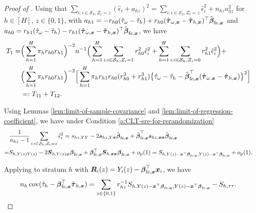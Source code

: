 \documentclass[12pt]{article}
\newcommand{\cov}{\operatorname{cov}}
\newcommand{\op}{o_{\textnormal{p}}}
\newcommand{\ms}{\mathcal{S}}
\newcommand{\fe}{\textnormal{fe}}
\newcommand{\bs}{\boldsymbol}
\begin{document}
\begin{proof}[Proof of ]
Using that $\sum_{i:i\in\ms_h,Z_i=z}  (\hat{\epsilon}_i+a_{hz})^2 = \sum_{i:i\in\ms_h,Z_i=z}  \hat{\epsilon}_i^2 + n_{hz} a_{hz}^2$ for $h\in [H]$, $z\in\{0,1\}$, with $a_{h1} = - r_{h0}(\hat{\tau}_{\omega}-\hat{\tau}_{h}) + r_{h0}(\hat{\bs{\tau}}_{\omega, \bs{x}}-\hat{\bs{\tau}}_{h, \bs{x}})^\top \hat{\bs{\beta}}_{\fe, \bs{x}}$ and $a_{h0} = r_{h1}(\hat{\tau}_{\omega}-\hat{\tau}_{h}) - r_{h1}(\hat{\bs{\tau}}_{\omega, \bs{x}}-\hat{\bs{\tau}}_{h, \bs{x}})^\top \hat{\bs{\beta}}_{\fe, \bs{x}}$, we have 
\begin{align*}
      T_1 =&  \Big(\sum_{h=1}^H \pi_{h} r_{h0} r_{h1}\Big)^{-2}n^{-1} \Big(\sum_{h=1}^H \sum_{i:i\in\ms_h,Z_i=1}r_{h0}^2  \hat{\epsilon}_i^2 + \sum_{h=1}^H \sum_{i:i\in\ms_h, Z_i=0}r_{h1}^2 \hat{\epsilon}_i^2\Big)+ \\
      & \Big(\sum_{h=1}^H \pi_{h} r_{h0} r_{h1}\Big)^{-2} \Big[\sum_{h=1}^H \pi_hr_{h1}r_{h0}(r_{h0}^3 + r_{h1}^3)  \big\{\hat{\tau}_{\omega}-\hat{\tau}_{h}-\hat{\bs{\beta}}_{\fe, \bs{x}}^\top(\hat{\bs{\tau}}_{\omega,\bs{x}}-\hat{\bs{\tau}}_{h,\bs{x}})\big\}^2\Big]\\
      & =: T_{11} + T_{12} .
\end{align*}

Using Lemmas \ref{lem:limit-of-sample-covariance} and \ref{lem:limit-of-regression-coefficient}, we have under Condition \ref{a:CLT-sre-for-rerandomization}
\begin{align*}
    &\frac{1}{n_{hz}-1}\sum_{i:i\in\ms_h,Z_i=z}  \hat{\epsilon}_i^2 = s_{hz,YY} - 2 \bs{s}_{hz,Y\bs{x}}\hat{\bs{\beta}}_{\fe, \bs{x}} + \hat{\bs{\beta}}_{\fe, \bs{x}}^\top\bs{s}_{hz,\bs{x}\bs{x}}\hat{\bs{\beta}}_{\fe, \bs{x}}  \\
     = & S_{h,Y(z)Y(z)} - 2 \bs{S}_{h,Y(z)\bs{x}}\bs{\beta}_{\fe, \bs{x}} + \bs{\beta}_{\fe, \bs{x}}^\top\bs{S}_{h,\bs{x}\bs{x}}\bs{\beta}_{\fe, \bs{x}} + \op(1) = S_{h,Y(z)-\bs{x}^\top \bs{\beta}_{\fe, \bs{x}},Y(z)-\bs{x}^\top \bs{\beta}_{\fe, \bs{x}}} + \op(1).
\end{align*}

Applying  to stratum $h$ with $\bs{R}_i(z) = Y_i(z) - \bs{\beta}_{\fe, \bs{x}}^\top \bs{x}_i$, we have
 \[
 n_h \cov(\hat{\tau}_{h}-\bs{\beta}_{\fe, \bs{x}}^\top \hat{\bs{\tau}}_{h,\bs{x}}) = \sum_{z\in\{0,1\}}r_{hz}^{-1}S_{h,Y(z)-\bs{x}^\top \bs{\beta}_{\fe, \bs{x}},Y(z)-\bs{x}^\top \bs{\beta}_{\fe, \bs{x}}} - S_{h,\tau\tau}.
 \]


\end{proof}
\end{document}
